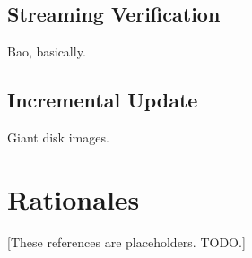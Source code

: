 \documentclass[11pt,notitlepage,a4paper]{article}
\begin{document}
\subsection{Streaming Verification}\label{sec:streamingverification}

Bao, basically.

\subsection{Incremental Update}\label{sec:incrementalupdate}

Giant disk images.

\section{Rationales}\label{sec:rationales}

\nocite{*}



[These references are placeholders. TODO.]
\end{document}
